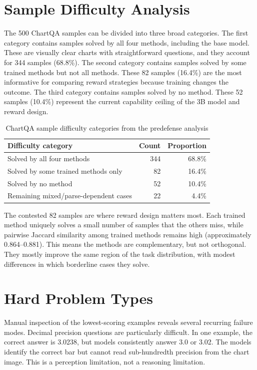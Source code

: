 \documentclass{iutbscthesis}
\begin{document}
\section{Sample Difficulty Analysis}

The 500 ChartQA samples can be divided into three broad categories. The first category contains samples solved by all four methods, including the base model. These are visually clear charts with straightforward questions, and they account for 344 samples (68.8\%). The second category contains samples solved by some trained methods but not all methods. These 82 samples (16.4\%) are the most informative for comparing reward strategies because training changes the outcome. The third category contains samples solved by no method. These 52 samples (10.4\%) represent the current capability ceiling of the 3B model and reward design.

\begin{table}[H]
    \centering
    \begin{tabular}{lrr}
        \toprule
        Difficulty category & Count & Proportion \\
        \midrule
        Solved by all four methods & 344 & 68.8\% \\
        Solved by some trained methods only & 82 & 16.4\% \\
        Solved by no method & 52 & 10.4\% \\
        Remaining mixed/parse-dependent cases & 22 & 4.4\% \\
        \bottomrule
    \end{tabular}
    \caption{ChartQA sample difficulty categories from the predefense analysis}
    \label{tab:difficulty_categories}
\end{table}

The contested 82 samples are where reward design matters most. Each trained method uniquely solves a small number of samples that the others miss, while pairwise Jaccard similarity among trained methods remains high (approximately 0.864--0.881). This means the methods are complementary, but not orthogonal. They mostly improve the same region of the task distribution, with modest differences in which borderline cases they solve.

\section{Hard Problem Types}

Manual inspection of the lowest-scoring examples reveals several recurring failure modes. Decimal precision questions are particularly difficult. In one example, the correct answer is 3.0238, but models consistently answer 3.0 or 3.02. The models identify the correct bar but cannot read sub-hundredth precision from the chart image. This is a perception limitation, not a reasoning limitation.
\end{document}
